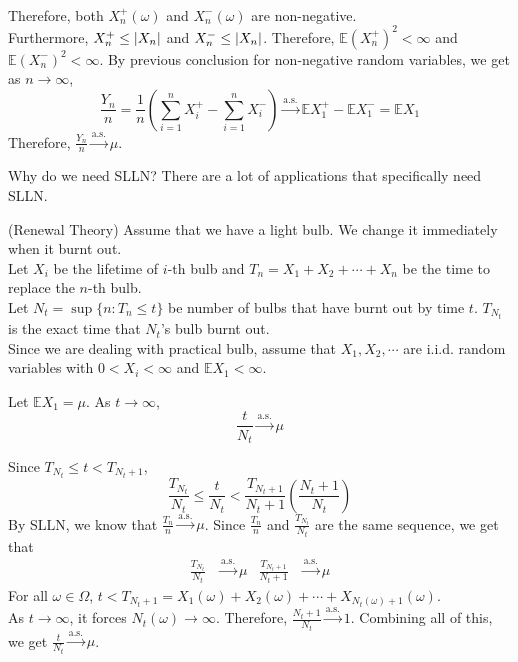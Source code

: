 \documentclass{huhtakm-template-book}
\newcommand{\expect}{\mathbb{E}}
\begin{document}
\begin{proofing}
\begin{align*}
	\end{align*}
	Therefore, both $X_{n}^{+}(\omega)$ and $X_{n}^{-}(\omega)$ are non-negative.\\
	Furthermore, $X_{n}^{+}\leq\left|{X_{n}}\right|$ and $X_{n}^{-}\leq\left|{X_{n}}\right|$. Therefore, $\expect(X_{n}^{+})^{2}<\infty$ and $\expect(X_{n}^{-})^{2}<\infty$.
	By previous conclusion for non-negative random variables, we get as $n\to\infty$,
	\begin{equation*}
		\frac{Y_{n}}{n}=\frac{1}{n}\left(\sum_{i=1}^{n}X_{i}^{+}-\sum_{i=1}^{n}X_{i}^{-}\right)\xrightarrow{\text{a.s.}}\expect X_{1}^{+}-\expect X_{1}^{-}=\expect X_{1}
	\end{equation*}
	Therefore, $\frac{Y_{n}}{n}\xrightarrow{\text{a.s.}}\mu$.
\end{proofing}
\newpage
Why do we need SLLN? There are a lot of applications that specifically need SLLN.
\begin{eg}(Renewal Theory) Assume that we have a light bulb. We change it immediately when it burnt out.\\
	Let $X_{i}$ be the lifetime of $i$-th bulb and $T_{n}=X_{1}+X_{2}+\cdots+X_{n}$ be the time to replace the $n$-th bulb.\\
	Let $N_{t}=\sup\{n:T_{n}\leq t\}$ be number of bulbs that have burnt out by time $t$. $T_{N_{t}}$ is the exact time that $N_{t}$'s bulb burnt out.\\
	Since we are dealing with practical bulb, assume that $X_{1},X_{2},\cdots$ are i.i.d. random variables with $0<X_{i}<\infty$ and $\expect X_{1}<\infty$.
\end{eg}
\begin{thm}
	Let $\expect X_{1}=\mu$. As $t\to\infty$,
	\begin{equation*}
		\frac{t}{N_{t}}\xrightarrow{\text{a.s.}}\mu
	\end{equation*}
\end{thm}
\begin{proofing}
	Since $T_{N_{t}}\leq t<T_{N_{t}+1}$,
	\begin{equation*}
		\frac{T_{N_{t}}}{N_{t}}\leq\frac{t}{N_{t}}<\frac{T_{N_{t}+1}}{N_{t}+1}\left(\frac{N_{t}+1}{N_{t}}\right)
	\end{equation*}
	By SLLN, we know that $\frac{T_{n}}{n}\xrightarrow{\text{a.s.}}\mu$. Since $\frac{T_{n}}{n}$ and $\frac{T_{N_{t}}}{N_{t}}$ are the same sequence, we get that
	\begin{align*}
		\frac{T_{N_{t}}}{N_{t}}&\xrightarrow{\text{a.s.}}\mu & \frac{T_{N_{t}+1}}{N_{t}+1}&\xrightarrow{\text{a.s.}}\mu
	\end{align*}
	For all $\omega\in\Omega$, $t<T_{N_{t}+1}=X_{1}(\omega)+X_{2}(\omega)+\cdots+X_{N_{t}(\omega)+1}(\omega)$.\\
	As $t\to\infty$, it forces $N_{t}(\omega)\to\infty$. Therefore, $\frac{N_{t}+1}{N_{t}}\xrightarrow{\text{a.s.}}1$.
	Combining all of this, we get $\frac{t}{N_{t}}\xrightarrow{\text{a.s.}}\mu$.
\end{proofing}
\end{document}

